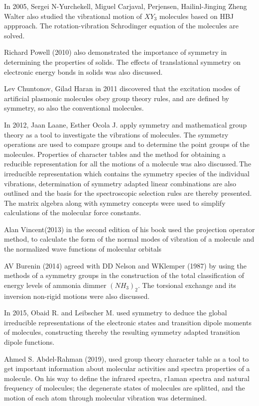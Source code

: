 \documentclass[a4paper, 12pt, openany]{report}
\begin{document}
	In 2005, Sergei N-Yurchekell, Miguel Carjaval, Perjensen, Hailinl-Jinging Zheng Walter also studied the vibrational motion of $XY_3$ molecules based on HBJ appproach. The rotation-vibration Schrodinger equation of the molecules are solved. 
	
	Richard Powell (2010) also demonstrated the importance of symmetry in \linebreak determining the properties of solids. The effects of translational symmetry on electronic energy bonds in solids was also discussed.
	
	Lev Chuntonov, Gilad Haran in 2011 discovered that the excitation modes of artificial plasmonic molecules obey group theory rules, and are defined by symmetry, so also the conventional molecules.
 	
 	In 2012, Jaan Laane, Esther Ocola J. apply symmetry and   mathematical group theory as a tool to investigate the vibrations of molecules. The \break symmetry operations are used to compare groups and to determine the point groups of the molecules. Properties of character tables and the method for obtaining a reducible representation for all the motions of a molecule was also discussed.\,The irreducible representation which contains the symmetry species of the individual vibrations, determination of symmetry adapted \break linear  combinations are also outlined and the basis for the spectroscopic \break selection rules are thereby presented. The matrix algebra along with \break symmetry concepts were used to simplify calculations of the molecular force constants.
 	
 	Alan Vincent(2013) in the second edition of his book used the projection operator method, to calculate the form of the normal modes of vibration of a molecule and the normalized wave functions of molecular orbitals
 	
 	AV Burenin (2014) agreed with DD Nelson and WKlemper (1987) by using the methods of a symmetry groups in the construction of the total classification of energy levels of ammonia dimmer $(NH_3)_2$. The torsional exchange and its inversion non-rigid motions were also discussed. 	
 	
 	In 2015, Obaid R. and Leibscher M. used symmetry to deduce the global irreducible representations of the electronic states and transition dipole \break moments of molecules, constructing thereby the resulting symmetry adapted transition dipole functions.
 	
 	Ahmed S. Abdel-Rahman (2019), used 	group theory character table as a tool to get important information about molecular activities and spectra properties of a molecule. On his way to define the infrared spectra, r1aman spectra and natural frequency of molecules; the degenerate states of molecules are splitted, and the motion of each atom through molecular vibration was determined. 
 	
\end{document}

